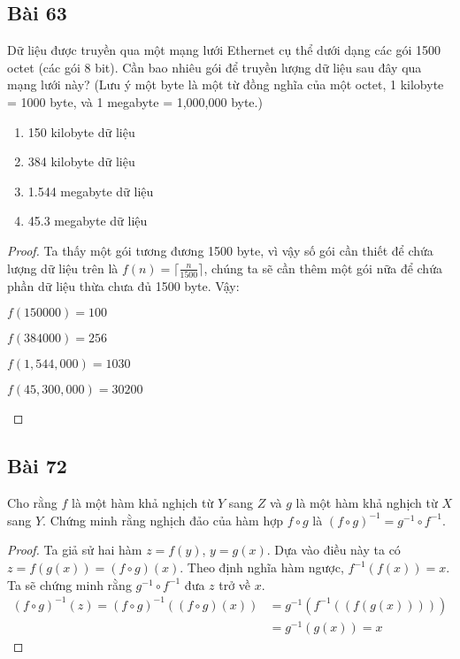 \subsection*{Bài 63}
Dữ liệu được truyền qua một mạng lưới Ethernet cụ thể dưới dạng các gói 1500 octet (các gói 8 bit). Cần bao nhiêu gói để truyền lượng dữ liệu sau đây qua mạng lưới này? (Lưu ý một byte là một từ đồng nghĩa của một octet, 1 kilobyte = 1000 byte, và 1 megabyte = 1,000,000 byte.)
\begin{enumerate}[label=\alph*)]
    \item 150 kilobyte dữ liệu
    \item 384 kilobyte dữ liệu
    \item 1.544 megabyte dữ liệu
    \item 45.3 megabyte dữ liệu
\end{enumerate}
\begin{proof}
    Ta thấy một gói tương đương 1500 byte, vì vậy số gói cần thiết để chứa lượng dữ liệu trên là $f(n)=\lceil \frac{n}{1500} \rceil$, chúng ta sẽ cần thêm một gói nữa để chứa phần dữ liệu thừa chưa đủ 1500 byte. Vậy:
    \begin{enumerate}[label=\alph*)]
        \begin{multicols}{2}
            \item $f(150000)=100$
            \item $f(384000)=256$
            \item $f(1,544,000)=1030$
            \item $f(45,300,000)=30200$
        \end{multicols}
    \end{enumerate}
\end{proof}
\subsection*{Bài 72}
Cho rằng $f$ là một hàm khả nghịch từ $Y$ sang $Z$ và $g$ là một hàm khả nghịch từ $X$ sang $Y$. Chứng minh rằng nghịch đảo của hàm hợp $f\circ g$ là $(f\circ g)^{-1}=g^{-1}\circ f^{-1}$.
\begin{proof}
    Ta giả sử hai hàm $z=f(y)$, $y=g(x)$. Dựa vào điều này ta có $z=f(g(x))=(f\circ g)(x)$. Theo định nghĩa hàm ngược, $f^{-1}(f(x))=x$. Ta sẽ chứng minh rằng $g^{-1}\circ f^{-1}$ đưa $z$ trở về $x$.
    \begin{align*}
        (f\circ g)^{-1}(z) = (f\circ g)^{-1}((f\circ g)(x)) &= g^{-1}(f^{-1}((f(g(x)))))\\
        &=g^{-1}(g(x))=x
    \end{align*}
\end{proof}
